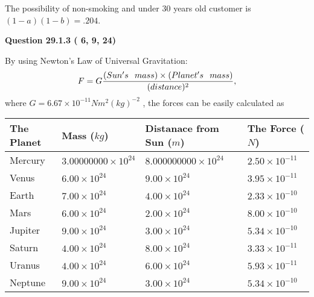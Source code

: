 \documentclass[12pt]{article}
\begin{document}
The possibility of  %
 non-smoking and  %
under 30 years old
customer is $ (1-a)(1-b) =  %
.204 $.
 
 
  
\vspace{0.2in}
  
{\textbf{\Large{Question
29.1.3 
 (          6,          9,         24)
}}}
  
  
 
 
\noindent{}

By using Newton's Law of Universal Gravitation:
\[
F=G \frac{(Sun's \hspace{0.1in} mass) \times (Planet's \hspace{0.1in} mass)} { (distance)^2},
\]
where
$ G= %
6.67 \times 10^{-11}N m^{2}(kg)^{-2}$ , the forces can be easily calculated as
 
\vspace{0.2in}
 
 
\begin{tabular}{|l|l|l|l|}
\hline
The Planet & Mass ($kg$) & Distanace from Sun ($m$) & The Force ($N$)\\
\hline
Mercury  &
           $ %
3.00000000 \times 10^{24} $   &
             $ %
8.000000000 \times 10^{24} $    & $ %
2.50 \times 10^{-11} $
\\  \hline
Venus    &
           $  %
6.00 \times 10^{24}  $     &
             $ %
9.00 \times 10^{24} $    & $ %
3.95 \times 10^{-11} $
\\  \hline
Earth    &
           $  %
7.00 \times 10^{24}  $     &
             $ %
4.00 \times 10^{24} $    & $ %
2.33 \times 10^{-10} $
\\   \hline
Mars     &
           $  %
6.00 \times 10^{24} $     &
             $ %
2.00 \times 10^{24} $    & $ %
8.00 \times 10^{-10} $
\\   \hline
Jupiter  &
           $  %
9.00 \times 10^{24} $    &
             $ %
3.00 \times 10^{24} $    & $ %
5.34 \times 10^{-10} $
\\  \hline
Saturn   &
           $  %
4.00 \times 10^{24} $    &
             $ %
8.00 \times 10^{24}  $    & $ %
3.33 \times 10^{-11} $
\\  \hline
Uranus   &
           $  %
4.00 \times 10^{24} $    &
             $ %
6.00 \times 10^{24} $    & $ %
5.93 \times 10^{-11} $
\\  \hline
Neptune  &
           $  %
9.00 \times 10^{24} $    &
             $ %
3.00 \times 10^{24} $    & $ %
5.34 \times 10^{-10} $
\\  \hline
 
\end{tabular}
 
\end{document}
